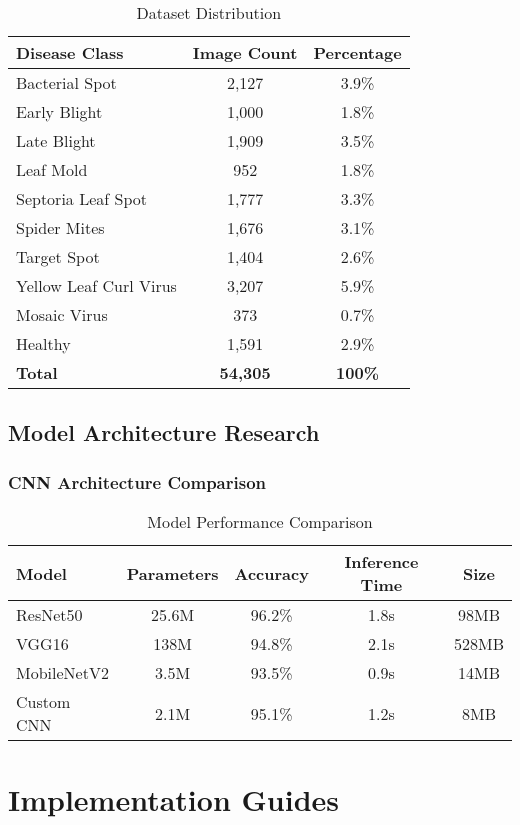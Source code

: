 \documentclass[12pt,a4paper]{article}
\begin{document}
\begin{table}[H]
\centering
\begin{tabular}{|l|c|c|}
\hline
\textbf{Disease Class} & \textbf{Image Count} & \textbf{Percentage} \\
\hline
Bacterial Spot & 2,127 & 3.9\% \\
Early Blight & 1,000 & 1.8\% \\
Late Blight & 1,909 & 3.5\% \\
Leaf Mold & 952 & 1.8\% \\
Septoria Leaf Spot & 1,777 & 3.3\% \\
Spider Mites & 1,676 & 3.1\% \\
Target Spot & 1,404 & 2.6\% \\
Yellow Leaf Curl Virus & 3,207 & 5.9\% \\
Mosaic Virus & 373 & 0.7\% \\
Healthy & 1,591 & 2.9\% \\
\hline
\textbf{Total} & \textbf{54,305} & \textbf{100\%} \\
\hline
\end{tabular}
\caption{Dataset Distribution}
\end{table}

\subsection{Model Architecture Research}

\subsubsection{CNN Architecture Comparison}
\begin{table}[H]
\centering
\begin{tabular}{|l|c|c|c|c|}
\hline
\textbf{Model} & \textbf{Parameters} & \textbf{Accuracy} & \textbf{Inference Time} & \textbf{Size} \\
\hline
ResNet50 & 25.6M & 96.2\% & 1.8s & 98MB \\
VGG16 & 138M & 94.8\% & 2.1s & 528MB \\
MobileNetV2 & 3.5M & 93.5\% & 0.9s & 14MB \\
Custom CNN & 2.1M & 95.1\% & 1.2s & 8MB \\
\hline
\end{tabular}
\caption{Model Performance Comparison}
\end{table}

\section{Implementation Guides}
\end{document}
